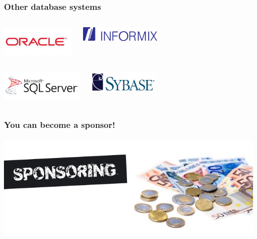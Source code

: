\documentclass{beamer}
\begin{document}
\begin{frame}
  \frametitle{Other database systems}

  \begin{columns}[c]
    \begin{center}
      \includegraphics[height=4em]{oracle-logo.png}
    \end{center}
    \begin{center}
      \includegraphics[height=2em]{Informix_d1323_450x450.png}
    \end{center}
  \end{columns}
  \vfill

  \begin{columns}[c]
    \begin{center}
      \includegraphics[height=4em]{mssql.png}
    \end{center}
    \begin{center}
      \includegraphics[height=3em]{sybase_logo.png}
    \end{center}
  \end{columns}
\end{frame}

\begin{frame}
  \frametitle{You can become a sponsor!}


  \begin{center}
    \includegraphics[height=2.1in]{sponsoring.jpg}
  \end{center}
\end{frame}
\end{document}
